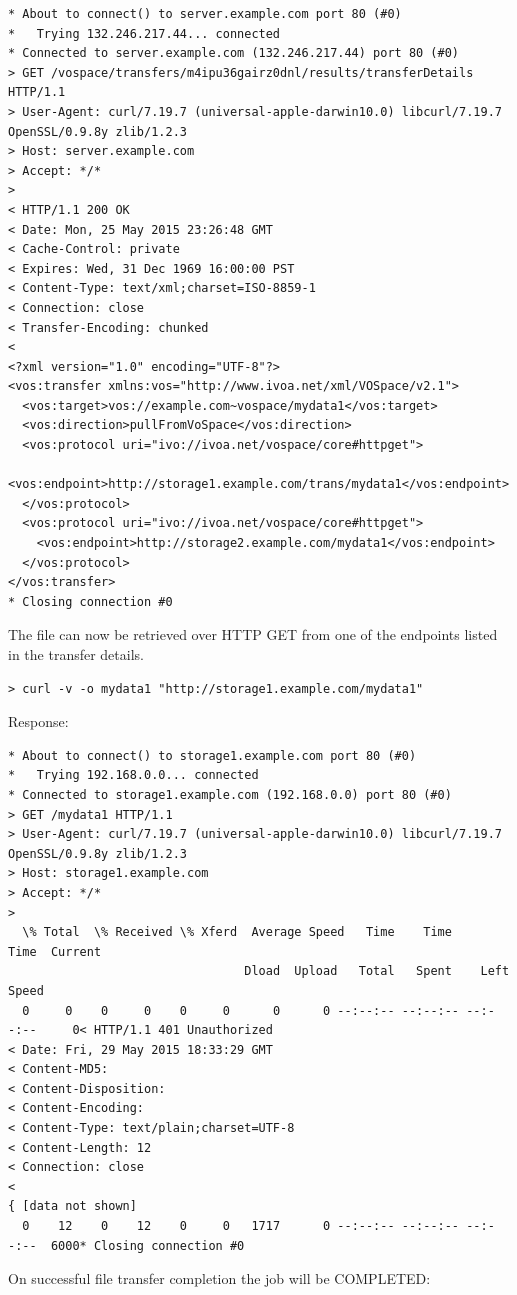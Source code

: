 \documentclass[11pt,a4paper]{ivoa}
\begin{document}
\begin{lstlisting}
* About to connect() to server.example.com port 80 (#0)
*   Trying 132.246.217.44... connected
* Connected to server.example.com (132.246.217.44) port 80 (#0)
> GET /vospace/transfers/m4ipu36gairz0dnl/results/transferDetails HTTP/1.1
> User-Agent: curl/7.19.7 (universal-apple-darwin10.0) libcurl/7.19.7 OpenSSL/0.9.8y zlib/1.2.3
> Host: server.example.com
> Accept: */*
>
< HTTP/1.1 200 OK
< Date: Mon, 25 May 2015 23:26:48 GMT
< Cache-Control: private
< Expires: Wed, 31 Dec 1969 16:00:00 PST
< Content-Type: text/xml;charset=ISO-8859-1
< Connection: close
< Transfer-Encoding: chunked
<
<?xml version="1.0" encoding="UTF-8"?>
<vos:transfer xmlns:vos="http://www.ivoa.net/xml/VOSpace/v2.1">
  <vos:target>vos://example.com~vospace/mydata1</vos:target>
  <vos:direction>pullFromVoSpace</vos:direction>
  <vos:protocol uri="ivo://ivoa.net/vospace/core#httpget">
    <vos:endpoint>http://storage1.example.com/trans/mydata1</vos:endpoint>
  </vos:protocol>
  <vos:protocol uri="ivo://ivoa.net/vospace/core#httpget">
    <vos:endpoint>http://storage2.example.com/mydata1</vos:endpoint>
  </vos:protocol>
</vos:transfer>
* Closing connection #0
\end{lstlisting}
The file can now be retrieved over HTTP GET from one of the endpoints listed in the transfer details.
\begin{lstlisting}
> curl -v -o mydata1 "http://storage1.example.com/mydata1"
\end{lstlisting}
Response:
\begin{lstlisting}
* About to connect() to storage1.example.com port 80 (#0)
*   Trying 192.168.0.0... connected
* Connected to storage1.example.com (192.168.0.0) port 80 (#0)
> GET /mydata1 HTTP/1.1
> User-Agent: curl/7.19.7 (universal-apple-darwin10.0) libcurl/7.19.7 OpenSSL/0.9.8y zlib/1.2.3
> Host: storage1.example.com
> Accept: */*
>
  \% Total  \% Received \% Xferd  Average Speed   Time    Time     Time  Current
                                 Dload  Upload   Total   Spent    Left  Speed
  0     0    0     0    0     0      0      0 --:--:-- --:--:-- --:--:--     0< HTTP/1.1 401 Unauthorized
< Date: Fri, 29 May 2015 18:33:29 GMT
< Content-MD5:
< Content-Disposition:
< Content-Encoding:
< Content-Type: text/plain;charset=UTF-8
< Content-Length: 12
< Connection: close
<
{ [data not shown]
  0    12    0    12    0     0   1717      0 --:--:-- --:--:-- --:--:--  6000* Closing connection #0
\end{lstlisting}
On successful file transfer completion the job will be COMPLETED:
\end{document}
